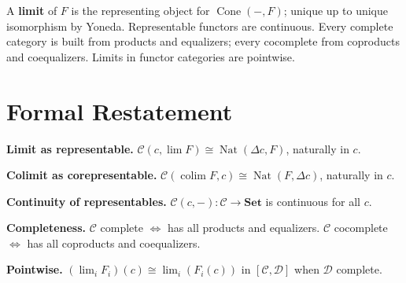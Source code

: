 \begin{summarybox}
A \textbf{limit} of $F$ is the representing object for $\operatorname{Cone}(-,F)$;
unique up to unique isomorphism by Yoneda. Representable functors are continuous.
Every complete category is built from products and equalizers; every cocomplete
from coproducts and coequalizers. Limits in functor categories are pointwise.
\end{summarybox}

\section{Formal Restatement}

\begin{formalrestatement}
\textbf{Limit as representable.}
$\mathcal{C}(c,\lim F) \cong \operatorname{Nat}(\Delta c, F)$, naturally in $c$.

\textbf{Colimit as corepresentable.}
$\mathcal{C}(\operatorname{colim} F, c) \cong \operatorname{Nat}(F, \Delta c)$, naturally in $c$.

\textbf{Continuity of representables.}
$\mathcal{C}(c,-) : \mathcal{C} \to \mathbf{Set}$ is continuous for all $c$.

\textbf{Completeness.}
$\mathcal{C}$ complete $\Leftrightarrow$ has all products and equalizers.
$\mathcal{C}$ cocomplete $\Leftrightarrow$ has all coproducts and coequalizers.

\textbf{Pointwise.}
$(\lim_i F_i)(c) \cong \lim_i(F_i(c))$ in $[\mathcal{C},\mathcal{D}]$ when $\mathcal{D}$ complete.
\end{formalrestatement}
